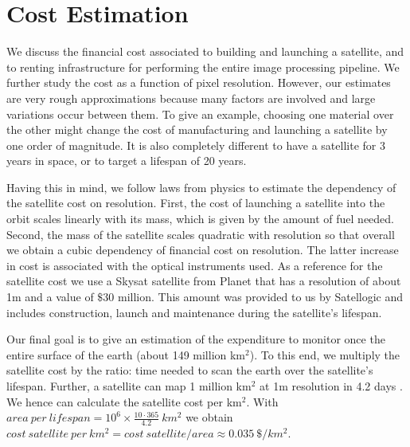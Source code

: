 \section{Cost Estimation}

We discuss the financial cost associated to building and launching a satellite, and to renting infrastructure for performing the entire image processing pipeline. We further study the cost as a function of pixel resolution. However, our estimates are very rough approximations because many factors are involved and large variations occur between them. To give an example, choosing one material over the other might change the cost of manufacturing and launching a satellite by one order of magnitude. It is also completely different to have a satellite for 3 years in space, or to target a lifespan of 20 years. 

Having this in mind, we follow laws from physics to estimate the dependency of the satellite cost on resolution. First, the cost of launching a satellite into the orbit scales linearly with its mass, which is given by the amount of fuel needed. Second, the mass of the satellite scales quadratic with resolution so that overall we obtain a cubic dependency of financial cost on resolution. The latter increase in cost is associated with the optical instruments used. As a reference for the satellite cost we use a Skysat satellite from Planet \parencite{skysat_planet} that has a resolution of about 1m and a value of $\$30$ million. This amount was provided to us by Satellogic and includes construction, launch and maintenance during the satellite's lifespan.

Our final goal is to give an estimation of the expenditure to monitor once the entire surface of the earth (about 149 million km$^2$). To this end, we multiply the satellite cost by the ratio: time needed to scan the earth over the satellite's lifespan. Further, a satellite can map 1 million km$^2$ at 1m resolution in 4.2 days \parencite{satellogic_youtube}. We hence can calculate the satellite cost per km$^2$. With $area~per~lifespan = 10^6 \times \frac{10\cdot365}{4.2}~km^2$ we obtain $cost~satellite~per~km^2 = cost~satellite/area \approx 0.035~\$/km^2$.

